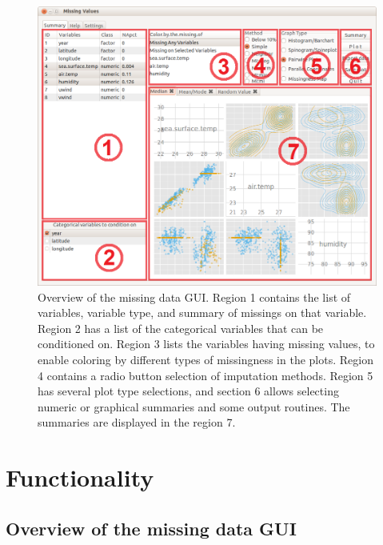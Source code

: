 \documentclass[article]{jss}
\begin{document}
\begin{center}
\begin{figure}[h]
\begin{centering}
\includegraphics[width=.9\textwidth]{graph/fig1-GUI-tab1}
\par\end{centering}
\caption{Overview of the missing data GUI. Region 1 contains the list of variables, variable type, and summary of missings on that variable. Region 2 has a list of the categorical variables that can be conditioned on. Region 3 lists the variables having missing values, to enable coloring by different types of missingness in the plots. Region 4 contains a radio button selection of imputation methods. Region 5 has several plot type selections, and section 6 allows selecting numeric or graphical summaries and some output routines. The summaries are displayed in the region 7.}
\label{fig:missingGUI}
\end{figure}
\par\end{center}

\section{Functionality}\label{Functionality}

\subsection{Overview of the missing data GUI}
\end{document}
